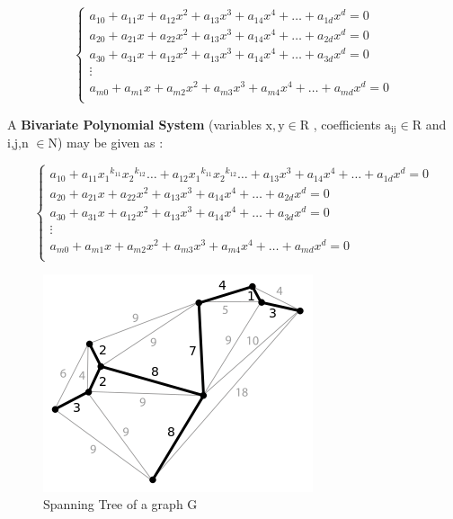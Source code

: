 \documentclass[11pt]{article}
\begin{document}
\begin{equation}  
   \begin{cases}
    a_{10}+a_{11}x+a_{12}x^2+a_{13}x^3+a_{14}x^4+\ldots+a_{1d}x^d=0 \\
    a_{20}+a_{21}x+a_{22}x^2+a_{13}x^3+a_{14}x^4+\ldots+a_{2d}x^d=0 \\
    a_{30}+a_{31}x+a_{12}x^2+a_{13}x^3+a_{14}x^4+\ldots+a_{3d}x^d=0 \\
    \vdots \\
    a_{m0}+a_{m1}x+a_{m2}x^2+a_{m3}x^3+a_{m4}x^4+\ldots+a_{md}x^d=0 \\
  \end{cases}
\end{equation}

A \textbf{Bivariate Polynomial System}  (variables  $\mathrm{x,y \in R}$ ,  coefficients  $\mathrm{a_{ij} \in R}$  and i,j,n $\mathrm{\in N}$) may be given as : 

\begin{equation}  
   \begin{cases}
    a_{10}+a_{11} {x_1}^{k_{11}} {x_2}^{k_{12}}\ldots+a_{12}{x_1}^{k_{11}} {x_2}^{k_{12}}\ldots+a_{13}x^3+a_{14}x^4+\ldots+a_{1d}x^d=0 \\
    a_{20}+a_{21}x+a_{22}x^2+a_{13}x^3+a_{14}x^4+\ldots+a_{2d}x^d=0 \\
    a_{30}+a_{31}x+a_{12}x^2+a_{13}x^3+a_{14}x^4+\ldots+a_{3d}x^d=0 \\
    \vdots \\
    a_{m0}+a_{m1}x+a_{m2}x^2+a_{m3}x^3+a_{m4}x^4+\ldots+a_{md}x^d=0 \\
  \end{cases}
\end{equation}



\begin{figure}[h!]
  \centering
  \includegraphics[width=0.4\linewidth]{spanning.png}
  \caption[Spanning Tree of a graph G ]{Spanning Tree of a graph G \footnotemark}
  \label{fig:spanningTree}
\end{figure}
\end{document}
